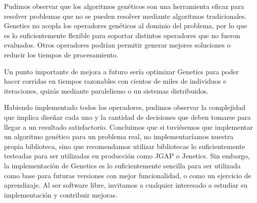 \documentclass{conaiisi}
\begin{document}
\begin{multicols}{2}
{Pudimos observar que los algoritmos genéticos son una herramienta eficaz para resolver problemas que no se pueden resolver mediante algoritmos tradicionales.
Genetics no acopla los operadores genéticos al dominio del problema, por lo que es lo suficientemente flexible para soportar distintos operadores que no fueron evaluados.
Otros operadores podrían permitir generar mejores soluciones o reducir los tiempos de procesamiento.

Un punto importante de mejora a futuro sería optimizar Genetics para poder hacer corridas en tiempos razonables con cientos de miles de individuos e iteraciones, quizás mediante paralelismo o un sistemas distribuidos.

Habiendo implementado todos los operadores, pudimos observar la complejidad que implica diseñar cada uno y la cantidad de decisiones que deben tomarse para llegar a un resultado satisfactorio.
Concluimos que si tuviésemos que implementar un algoritmo genético para un problema real, no implementaríamos nuestra propia biblioteca, sino que recomendamos utilizar bibliotecas lo suficientemente testeadas para ser utilizadas en producción como JGAP\cite{jgap} o Jenetics\cite{jenetics}.
Sin embargo, la implementación de Genetics es lo suficientemente sencilla para ser utilizada como base para futuras versiones con mejor funcionalidad, o como un ejercicio de aprendizaje.
Al ser software libre, invitamos a cualquier interesado a estudiar su implementación y contribuir mejoras.

}



\textup{
\printbibliography[heading=subbibintoc]
}
\end{multicols}
\end{document}
